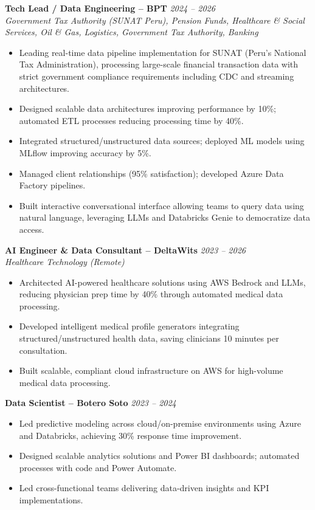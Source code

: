 \textbf{Tech Lead / Data Engineering – BPT} \hfill \textit{2024 – 2026} \\
\textit{Government Tax Authority (SUNAT Peru), Pension Funds, Healthcare \& Social Services, Oil \& Gas, Logistics, Government Tax Authority, Banking} \\[-0.6em]
\begin{itemize}[leftmargin=*]
    \item Leading real-time data pipeline implementation for SUNAT (Peru's National Tax Administration), processing large-scale financial transaction data with strict government compliance requirements including CDC and streaming architectures.
    \item Designed scalable data architectures improving performance by 10\%; automated ETL processes reducing processing time by 40\%.
    \item Integrated structured/unstructured data sources; deployed ML models using MLflow improving accuracy by 5\%.
    \item Managed client relationships (95\% satisfaction); developed Azure Data Factory pipelines.
    \item Built interactive conversational interface allowing teams to query data using natural language, leveraging LLMs and Databricks Genie to democratize data access.
\end{itemize}

\vspace{0.1em}

\textbf{AI Engineer \& Data Consultant – DeltaWits} \hfill \textit{2023 – 2026} \\
\textit{Healthcare Technology (Remote)} \\[-0.6em]
\begin{itemize}[leftmargin=*]
    \item Architected AI-powered healthcare solutions using AWS Bedrock and LLMs, reducing physician prep time by 40\% through automated medical data processing.
    \item Developed intelligent medical profile generators integrating structured/unstructured health data, saving clinicians 10 minutes per consultation.
    \item Built scalable, compliant cloud infrastructure on AWS for high-volume medical data processing.
\end{itemize}

\vspace{0.1em}

\textbf{Data Scientist – Botero Soto} \hfill \textit{2023 – 2024} \\[-0.6em]
\begin{itemize}[leftmargin=*]
    \item Led predictive modeling across cloud/on-premise environments using Azure and Databricks, achieving 30\% response time improvement.
    \item Designed scalable analytics solutions and Power BI dashboards; automated processes with code and Power Automate.
    \item Led cross-functional teams delivering data-driven insights and KPI implementations.
\end{itemize}

